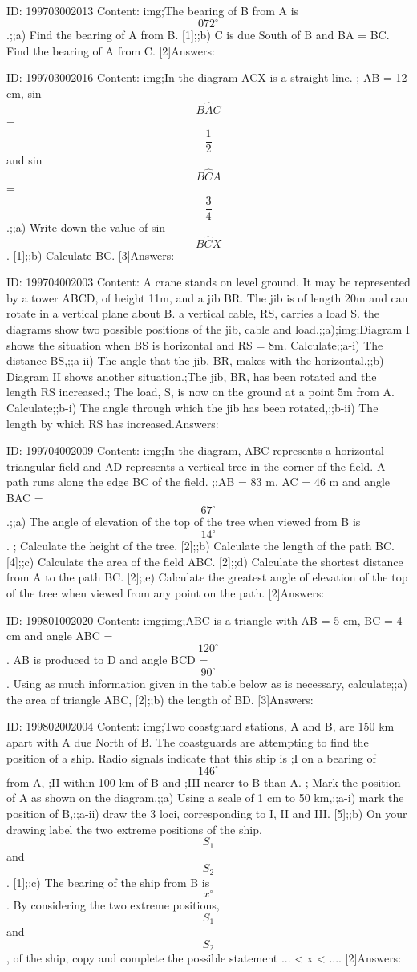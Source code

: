 \documentclass{article}
\begin{document}
ID: 199703002013
Content:
img;The bearing of B from A is $$072^{\circ}$$.;;a) Find the bearing of A from B. [1];;b) C is due South of B and BA = BC. Find the bearing of A from C. [2]Answers:

ID: 199703002016
Content:
img;In the diagram ACX is a straight line. ; AB = 12 cm, sin $$B \hat AC$$ = $$\frac{1}{2}$$ and sin $$B \hat CA$$= $$\frac{3}{4}$$.;;a) Write down the value of sin $$B \hat CX$$. [1];;b) Calculate BC. [3]Answers:

ID: 199704002003
Content:
A crane stands on level ground. It may be represented by a tower ABCD, of height 11m, and a jib BR. The jib is of length 20m and can rotate in a vertical plane about B. a vertical cable, RS, carries a load S. the diagrams show two possible positions of the jib, cable and load.;;a);img;Diagram I shows the situation when BS is horizontal and RS = 8m. Calculate;;a-i) The distance BS,;;a-ii) The angle that the jib, BR, makes with the horizontal.;;b) Diagram II shows another situation.;The jib, BR, has been rotated and the length RS increased.; The load, S, is now on the ground at a point 5m from A. Calculate;;b-i) The angle through which the jib has been rotated,;;b-ii) The length by which RS has increased.Answers:

ID: 199704002009
Content:
img;In the diagram, ABC represents a horizontal triangular field and AD represents a vertical tree in the corner of the field. A path runs along the edge BC of the field. ;;AB = 83 m, AC = 46 m and angle BAC = $$67^{\circ}$$.;;a) The angle of elevation of the top of the tree when viewed from B is $$14^{\circ}$$. ; Calculate the height of the tree. [2];;b) Calculate the length of the path BC. [4];;c) Calculate the area of the field ABC. [2];;d) Calculate the shortest distance from A to the path BC. [2];;e) Calculate the greatest angle of elevation of the top of the tree when viewed from any point on the path. [2]Answers:

ID: 199801002020
Content:
img;img;ABC is a triangle with AB = 5 cm, BC = 4 cm and angle ABC = $$120^{\circ}$$. AB is produced to D and angle BCD = $$90^{\circ}$$. Using as much information given in the table below as is necessary, calculate;;a) the area of triangle ABC, [2];;b) the length of BD. [3]Answers:

ID: 199802002004
Content:
img;Two coastguard stations, A and B, are 150 km apart with A due North of B. The coastguards are attempting to find the position of a ship. Radio signals indicate that this ship is ;I	on a bearing of $$146^{\circ}$$ from A, ;II within 100 km of B and ;III nearer to B than A. ; Mark the position of A as shown on the diagram.;;a) Using a scale of 1 cm to 50 km,;;a-i) mark the position of B,;;a-ii) draw the 3 loci, corresponding to I, II and III. [5];;b) On your drawing label the two extreme positions of the ship, $$S_1$$ and $$S_2$$. [1];;c) The bearing of the ship from B is $$x^{\circ}$$. By considering the two extreme positions, $$S_1$$ and $$S_2$$, of the ship, copy and complete the possible statement ... < x < .... [2]Answers:
\end{document}
